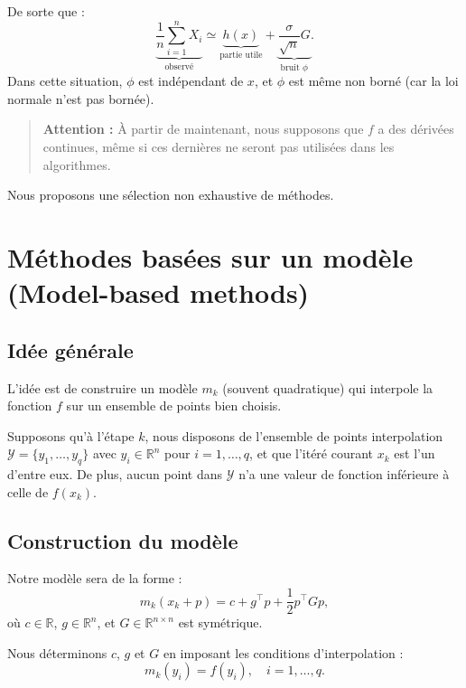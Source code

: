 De sorte que :
\[
    \underbrace{\frac{1}{n} \sum_{i=1}^n X_i}_{\text{observé}}
    \simeq
    \underbrace{h(x)}_{\text{partie utile}}
    +
    \underbrace{\frac{\sigma}{\sqrt{n}} G}_{\text{bruit } \phi}.
\]
Dans cette situation, $\phi$ est indépendant de $x$, et $\phi$ est même non borné (car la loi normale n'est pas bornée).

\begin{quote}
    \textbf{Attention :} À partir de maintenant, nous supposons que $f$ a des dérivées continues, même si ces dernières ne seront pas utilisées dans les algorithmes.
\end{quote}

Nous proposons une sélection non exhaustive de méthodes.

\section{Méthodes basées sur un modèle (Model-based methods)}

\subsection{Idée générale}
L'idée est de construire un modèle $m_k$ (souvent quadratique) qui interpole la fonction $f$ sur un ensemble de points bien choisis.

Supposons qu'à l'étape $k$, nous disposons de l'ensemble de points interpolation $\mathcal{Y} = \{y_1, \dots, y_q\}$ avec $y_i \in \mathbb{R}^n$ pour $i=1, \dots, q$, et que l'itéré courant $x_k$ est l'un d'entre eux. De plus, aucun point dans $\mathcal{Y}$ n'a une valeur de fonction inférieure à celle de $f(x_k)$.

\subsection{Construction du modèle}

Notre modèle sera de la forme :
\begin{equation}
    m_k(x_k + p) = c + g^\top p + \frac{1}{2} p^\top G p,
\end{equation}
où $c \in \mathbb{R}$, $g \in \mathbb{R}^n$, et $G \in \mathbb{R}^{n \times n}$ est symétrique.

Nous déterminons $c$, $g$ et $G$ en imposant les conditions d'interpolation :
\begin{equation}
    m_k(y_i) = f(y_i), \quad i=1, \dots, q.
\end{equation}

